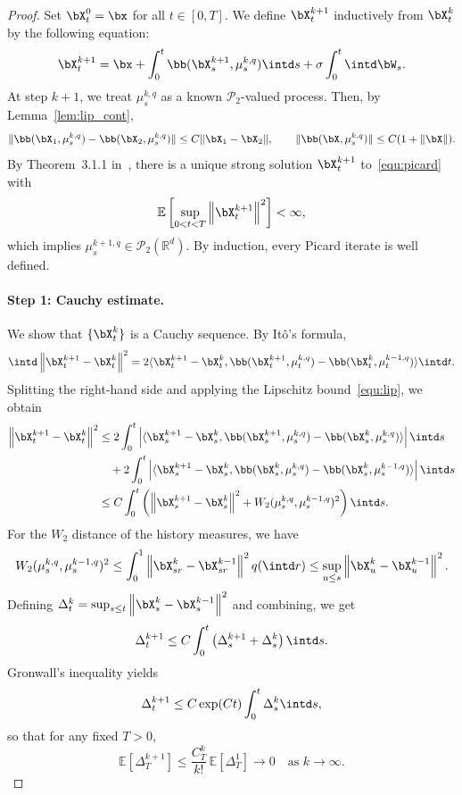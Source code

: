 \documentclass[a4paper,fleqn]{cas-sc}
\theoremstyle{definition}
\begin{document}
\begin{proof}
Set $\bX_t^0=\bx$ for all $t\in [0,T]$. We define $\bX^{k+1}_t$ inductively from $\bX^{k}_t$ by the following equation:
\begin{equation}\label{equ:picard}
   \bX_t^{k+1} = \bx  + \int_0^t \bb(\bX_s^{k+1},\mu_{s}^{k,q})\intd s  + \sigma \int_0^t \intd \bW_s.
\end{equation}
At step $k+1$, we treat $\mu_{s}^{k,q}$ as a known $\mathcal P_2$-valued process. Then, by Lemma~\ref{lem:lip_cont},
\[
\|\bb(\bX_1,\mu_{s}^{k,q})-\bb(\bX_2,\mu_{s}^{k,q})\|\leq C \|\bX_1-\bX_2\|, \qquad
\|\bb(\bX,\mu_{s}^{k,q})\|\leq C(1+\|\bX\|).
\]
By Theorem~3.1.1 in~\cite{prevot2007concise}, there is a unique strong solution $\bX^{k+1}_t$ to~\eqref{equ:picard} with
\[
\mathbb E\left[\sup_{0<t<T}\left\|\bX^{k+1}_t\right\|^2\right]< \infty,
\]
which implies $\mu_{s}^{k+1,q}\in \mathcal P_2(\mathbb R^{d})$. By induction, every Picard iterate is well defined.

\paragraph{Step 1: Cauchy estimate.}
We show that $\{\bX^k_t\}$ is a Cauchy sequence. By It\^o's formula,
\[
\intd \left\|\bX_t^{k+1}-\bX_t^{k}\right\|^2 = 2\langle \bX_t^{k+1}-\bX_t^{k} , \bb(\bX_t^{k+1},\mu_{t}^{k,q})-\bb(\bX_t^{k},\mu_{t}^{k-1,q})\rangle\intd t.
\]
Splitting the right-hand side and applying the Lipschitz bound~\eqref{equ:lip}, we obtain
\[
\begin{aligned}
    \left\|\bX_t^{k+1}-\bX_t^{k}\right\|^2
    &\leq 2\int_0^t \left| \langle \bX_s^{k+1}-\bX_s^{k} , \bb(\bX_s^{k+1},\mu_{s}^{k,q})-\bb(\bX_s^{k},\mu_{s}^{k,q}) \rangle \right| \intd s\\
    &\quad + 2\int_0^t \left| \langle \bX_s^{k+1}-\bX_s^{k} , \bb(\bX_s^{k},\mu_{s}^{k,q})-\bb(\bX_s^{k},\mu_{s}^{k-1,q}) \rangle\right| \intd s\\
    &\leq C \int_0^t\left( \left\|\bX_s^{k+1}-\bX_s^{k}\right\|^2
    +  W_2(\mu_{s}^{k,q},\mu_{s}^{k-1,q})^2\right)\intd s.
\end{aligned}
\]
For the $W_2$ distance of the history measures, we have 
\[
W_2(\mu_s^{k,q},\mu_s^{k-1,q})^2
\le
\int_0^1 \left\|\bX_{sr}^k-\bX_{sr}^{k-1}\right\|^2 q(\intd r)
\le
\sup_{u\le s}\left\|\bX_u^k-\bX_u^{k-1}\right\|^2.
\]
Defining $\Delta_t^{k} = \sup_{s\leq t} \left\|\bX_s^{k}-\bX_s^{k-1}\right\|^2$ and combining, we get
\[
    \Delta_t^{k+1} \leq C \int_0^t\left( \Delta_s^{k+1}
    +  \Delta_s^{k} \right)\intd s.
\]
Gronwall's inequality yields
\[
\Delta_t^{k+1}\leq C\exp(Ct)\int_0^t \Delta_s^{k}\intd s,
\]
so that for any fixed $T>0$,
\begin{equation}\label{equ:fraction}
\mathbb E \left[\Delta_T^{k+1} \right] \leq  \frac{C_T^k}{k!}\,\mathbb E \left[\Delta_T^{1} \right] \to 0 \quad \text{as } k\to\infty.
\end{equation}


\end{proof}
\end{document}
